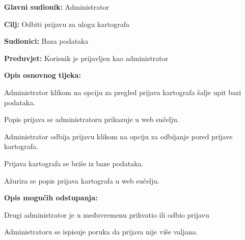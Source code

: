 				\noindent {}
				\begin{packed_item}
					
					\item \textbf{Glavni sudionik: }Administrator
					\item  \textbf{Cilj:} Odbiti prijavu za ulogu kartografa
					\item  \textbf{Sudionici:} Baza podataka
					\item  \textbf{Preduvjet:} Korisnik je prijavljen kao administrator
					\item  \textbf{Opis osnovnog tijeka:}
					
					\item[] \begin{packed_enum}
						
						\item Administrator klikom na opciju za pregled prijava kartografa šalje upit bazi podataka.
						\item Popis prijava se administratoru prikazuje u web sučelju.
						\item Administrator odbija prijavu klikom na opciju za odbijanje pored prijave kartografa.
						\item Prijava kartografa se briše iz baze podataka.
						\item Ažurira se popis prijava kartografa u web sučelju.
					\end{packed_enum}
					
					\item  \textbf{Opis mogućih odstupanja:}
					
					\item[] \begin{packed_item}
						
						\item[3.a] Drugi administrator je u međuvremenu prihvatio ili odbio prijavu
						\item[] \begin{packed_enum}
							
							\item Administratoru se ispisuje poruka da prijava nije više valjana.
							
						\end{packed_enum}
						
					\end{packed_item}
				\end{packed_item}
				
